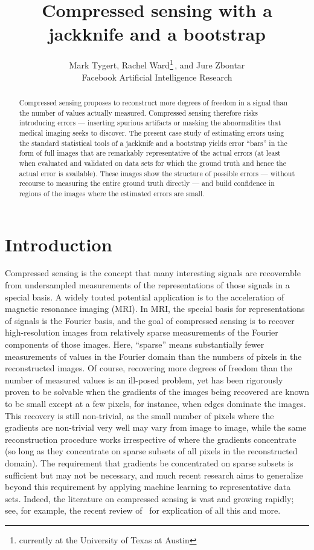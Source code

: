 \documentclass{article}
\title{Compressed sensing with a jackknife and a bootstrap}
\author{Mark Tygert,
Rachel Ward\thanks{currently at the University of Texas at Austin}\,,
and Jure Zbontar\medskip\\Facebook Artificial Intelligence Research}
\begin{document}
\maketitle



\begin{abstract}
Compressed sensing proposes to reconstruct more degrees of freedom in a signal
than the number of values actually measured.
Compressed sensing therefore risks introducing errors ---
inserting spurious artifacts or masking the abnormalities that
medical imaging seeks to discover.
The present case study of estimating errors using the standard statistical
tools of a jackknife and a bootstrap yields error ``bars'' in the form
of full images that are remarkably representative of the actual errors
(at least when evaluated and validated on data sets for which the ground truth
and hence the actual error is available).
These images show the structure of possible errors --- without recourse
to measuring the entire ground truth directly --- and build confidence
in regions of the images where the estimated errors are small.
\end{abstract}




\section{Introduction}

Compressed sensing is the concept that many interesting signals are recoverable
from undersampled measurements of the representations of those signals
in a special basis. A widely touted potential application
is to the acceleration of magnetic resonance imaging (MRI).
In MRI, the special basis for representations of signals is the Fourier basis,
and the goal of compressed sensing is to recover high-resolution images
from relatively sparse measurements of the Fourier components of those images.
Here, ``sparse'' means substantially fewer measurements of values
in the Fourier domain than the numbers of pixels in the reconstructed images.
Of course, recovering more degrees of freedom than the number of measured
values is an ill-posed problem, yet has been rigorously proven to be solvable
when the gradients of the images being recovered are known to be small
except at a few pixels, for instance, when edges dominate the images.
This recovery is still non-trivial,
as the small number of pixels where the gradients are non-trivial
very well may vary from image to image, while the same reconstruction procedure
works irrespective of where the gradients concentrate (so long as they
concentrate on sparse subsets of all pixels in the reconstructed domain).
The requirement that gradients be concentrated on sparse subsets
is sufficient but may not be necessary, and much recent research aims
to generalize beyond this requirement by applying machine learning
to representative data sets. Indeed, the literature on compressed sensing
is vast and growing rapidly; see, for example,
the recent review of~\cite{tropp} for explication of all this and more.
\end{document}
